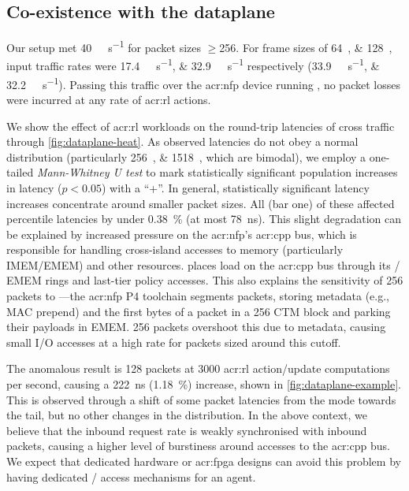 \subsection{Co-existence with the dataplane}
Our setup met \qty{40}{\giga\bit\per\second} for packet sizes $\ge$\qty{256}{\byte}.
For frame sizes of \qtylist{64;128}{\byte}, input traffic rates were \qtylist{17.4;32.9}{\giga\bit\per\second} respectively (\qtylist[per-symbol=p,sticky-per=true]{33.9;32.2}{\mega\packet\per\second}).
Passing this traffic over the \gls{acr:nfp} device running \approachshort, no packet losses were incurred at any rate of \gls{acr:rl} actions.

We show the effect of \gls{acr:rl} workloads on the round-trip latencies of cross traffic through \cref{fig:dataplane-heat}.
As observed latencies do not obey a normal distribution (particularly \qtylist{256;1518}{\byte}, which are bimodal), we employ a one-tailed \emph{Mann-Whitney U test} to mark statistically significant population increases in latency ($p < 0.05$) with a ``+''.
In general, statistically significant latency increases concentrate around smaller packet sizes.
All (bar one) of these affected  percentile latencies by under \qty{0.38}{\percent} (at most \qty{78}{\nano\second}).
This slight degradation can be explained by increased pressure on the \gls{acr:nfp}'s \gls{acr:cpp} bus, which is responsible for handling cross-island accesses to memory (particularly IMEM/EMEM) and other resources.
\approachshort{} places load on the \gls{acr:cpp} bus through its \inring{}/\outring{} EMEM rings and last-tier policy accesses.
This also explains the sensitivity of \qty{256}{\byte} packets to \approachshort{}---the \gls{acr:nfp} P4 toolchain segments packets, storing metadata (e.g., MAC prepend) and the first bytes of a packet in a \qty{256}{\byte} CTM block and parking their payloads in EMEM.
\qty{256}{\byte} packets overshoot this due to metadata, causing small I/O accesses at a high rate for packets sized around this cutoff.

The anomalous result is \qty{128}{\byte} packets at \num{3000} \gls{acr:rl} action/update computations per second, causing a \qty{222}{\nano\second} (\qty{1.18}{\percent}) increase, shown in \cref{fig:dataplane-example}.
This is observed through a shift of some packet latencies from the mode towards the tail, but no other changes in the distribution.
In the above context, we believe that the inbound request rate is weakly synchronised with inbound packets, causing a higher level of burstiness around accesses to the \gls{acr:cpp} bus.
We expect that dedicated hardware or \gls{acr:fpga} designs can avoid this problem by having dedicated \inring{}/\outring{} access mechanisms for an \approachshort{} agent.

